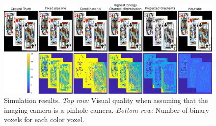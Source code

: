 \begin{figure}[!htb]
\centering
\includegraphics[width=0.99\columnwidth]{images/volumetric/acd_exp1/exp_pinhole}
\caption[Volumetric NED: Adaptive decomposition results: pinhole-camera reconstruction and number of binary voxels]{Simulation results. \emph{Top row:} Visual quality when assuming that the imaging camera is a pinhole camera. \emph{Bottom row:} Number of binary voxels for each color voxel.}
\label{fig:volumetric:acd:exp1:pinhole}
\end{figure}

